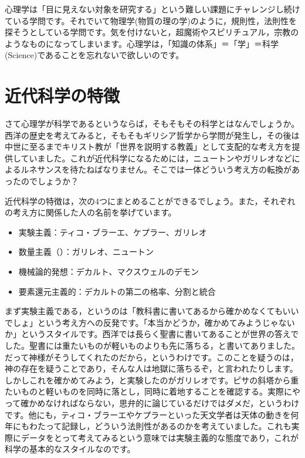 \documentclass{ltjsbook}
\begin{document}
心理学は「目に見えない対象を研究する」という難しい課題にチャレンジし続けている学問です。それでいて物理学(物質の理の学)のように，規則性，法則性を探そうとしている学問です。気を付けないと，超魔術やスピリチュアル，宗教のようなものになってしまいます。心理学は，「知識の体系」＝「学」＝科学(Science)であることを忘れないで欲しいのです。

\section{近代科学の特徴} 

さて心理学が科学であるというならば，そもそもその科学とはなんでしょうか。西洋の歴史を考えてみると，そもそもギリシア哲学から学問が発生し，その後は中世に至るまでキリスト教が「世界を説明する教義」として支配的な考え方を提供していました。これが近代科学になるためには，ニュートンやガリレオなどによるルネサンスを待たねばなりません。そこでは一体どういう考え方の転換があったのでしょうか？ 

近代科学の特徴は，次の4つにまとめることができるでしょう。また，それぞれの考え方に関係した人の名前を挙げています。
\begin{itemize}
\item 実験主義：ティコ・ブラーエ、ケプラー、ガリレオ
\item 数量主義（）：ガリレオ、ニュートン
\item 機械論的発想：デカルト、マクスウェルのデモン
\item 要素還元主義的：デカルトの第二の格率、分割と統合
\end{itemize}

まず実験主義である，というのは「教科書に書いてあるから確かめなくてもいいでしょ」という考え方への反発です。「本当かどうか，確かめてみようじゃないか」というスタイルです。西洋では長らく聖書に書いてあることが世界の答えでした。聖書には重たいものが軽いものよりも先に落ちる，と書いてありました。だって神様がそうしてくれたのだから，というわけです。このことを疑うのは，神の存在を疑うことであり，そんな人は地獄に落ちるぞ，と言われたりします。しかしこれを確かめてみよう，と実験したのがガリレオです。ピサの斜塔から重たいものと軽いものを同時に落とし，同時に着地することを確認する。実際にやって確かめなければならない，思弁的に論じているだけではダメだ，というわけです。他にも，ティコ・ブラーエやケプラーといった天文学者は天体の動きを何年にもわたって記録し，どういう法則性があるのかを考えていました。これも実際にデータをとって考えてみるという意味では実験主義的な態度であり，これが科学の基本的なスタイルなのです。
\end{document}
